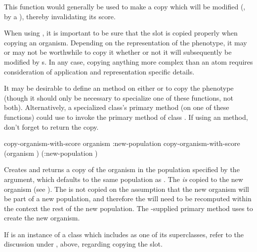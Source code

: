 {\filbreak

This function would generally be used to make a copy which will be modified (\eg, by
a ), thereby invalidating its score.

\filbreak

When using , it is important to be sure that the
 slot is copied properly when copying an organism. Depending on
the representation of the phenotype, it may or may not be worthwhile to copy it whether
or not it will subsequently be modified by s. In any case, copying
anything more complex than an atom requires consideration of application and
representation specific details.

\filbreak
It may be desirable to define an  method on either
 or  to copy the
phenotype (though it should only be necessary to specialize one of these functions,
not both). Alternatively, a specialized class's primary method (on one of these
functions) could use  to invoke the primary method of class
. If using an  method, don't forget to return the copy.

\filbreak

{\samepage
\Defgeneric copy-organism-with-score {organism \key :new-population}
 copy-organism-with-score {(organism )
                          \key (:new-population )}

Creates and returns a copy of the organism in the population specified by the
 argument, which defaults to the same population as
. The  {\em is} copied to the new organism (see
). The  is not copied on the
assumption that the new organism will be part of a new population, and therefore the
 will need to be recomputed within the context the rest of
the new population. The \geco-supplied primary method uses
 to create the new organism.
\par}%

\filbreak
If  is an instance of a class which includes
 as one of its superclasses, refer to the
discussion under , above, regarding copying the
 slot.

}
